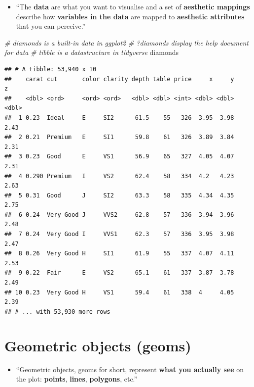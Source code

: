 \documentclass[]{book}
\newenvironment{Shaded}{\begin{snugshade}}{\end{snugshade}}
\newcommand{\CommentTok}[1]{\textcolor[rgb]{0.56,0.35,0.01}{\textit{{#1}}}}
\newcommand{\NormalTok}[1]{{#1}}
\providecommand{\tightlist}{%
  \setlength{\itemsep}{0pt}\setlength{\parskip}{0pt}}
\begin{document}
\begin{itemize}
\tightlist
\item
  ``The \textbf{data} are what you want to visualise and a set of
  \textbf{aesthetic mappings} describe how \textbf{variables in the
  data} are mapped to \textbf{aesthetic attributes} that you can
  perceive.'' \citep{ggplot2}
\end{itemize}

\begin{Shaded}
\begin{Highlighting}[]
\CommentTok{# diamonds is a built-in data in ggplot2}
\CommentTok{# ?diamonds display the help document for data }
\CommentTok{# tibble is a datastructure in tidyverse }
\NormalTok{diamonds}
\end{Highlighting}
\end{Shaded}

\begin{verbatim}
## # A tibble: 53,940 x 10
##    carat cut       color clarity depth table price     x     y     z
##    <dbl> <ord>     <ord> <ord>   <dbl> <dbl> <int> <dbl> <dbl> <dbl>
##  1 0.23  Ideal     E     SI2      61.5    55   326  3.95  3.98  2.43
##  2 0.21  Premium   E     SI1      59.8    61   326  3.89  3.84  2.31
##  3 0.23  Good      E     VS1      56.9    65   327  4.05  4.07  2.31
##  4 0.290 Premium   I     VS2      62.4    58   334  4.2   4.23  2.63
##  5 0.31  Good      J     SI2      63.3    58   335  4.34  4.35  2.75
##  6 0.24  Very Good J     VVS2     62.8    57   336  3.94  3.96  2.48
##  7 0.24  Very Good I     VVS1     62.3    57   336  3.95  3.98  2.47
##  8 0.26  Very Good H     SI1      61.9    55   337  4.07  4.11  2.53
##  9 0.22  Fair      E     VS2      65.1    61   337  3.87  3.78  2.49
## 10 0.23  Very Good H     VS1      59.4    61   338  4     4.05  2.39
## # ... with 53,930 more rows
\end{verbatim}

\section{\texorpdfstring{Geometric objects
(\textbf{geoms})}{Geometric objects (geoms)}}\label{geometric-objects-geoms}

\begin{itemize}
\tightlist
\item
  ``Geometric objects, geoms for short, represent \textbf{what you
  actually see} on the plot: \textbf{points}, \textbf{lines},
  \textbf{polygons}, etc.'' \citep{ggplot2}
\end{itemize}
\end{document}
